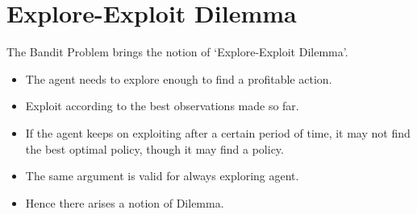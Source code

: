 \section{Explore-Exploit Dilemma}
The Bandit Problem brings the notion of `Explore-Exploit Dilemma'.

\begin{itemize}[leftmargin=*]
    \item The agent needs to explore enough to find a profitable action.
    \item Exploit according to the best observations made so far.
    \item If the agent keeps on exploiting after a certain period of time, it may not find the best optimal policy, though it may find a policy.
    \item The same argument is valid for always exploring agent.
    \item Hence there arises a notion of Dilemma.
\end{itemize}